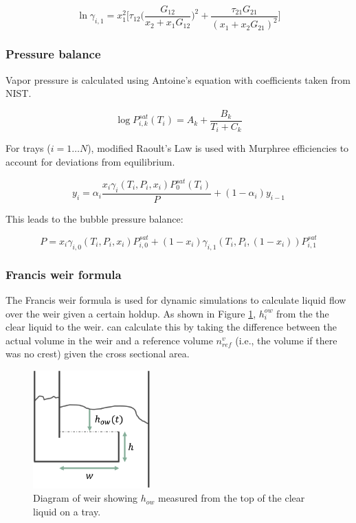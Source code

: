 \begin{equation}
     \ln \gamma_{i,1} = x_1^2\biggl [\tau_{12} \biggl (\frac{G_{12}}{x_2+x_1G_{12}}\biggr)^2 + \frac{\tau_{21}G_{21}}{(x_1 + x_2 G_{21})^2} \biggr ]   
\end{equation}

\subsubsection{Pressure balance}

Vapor pressure is calculated using Antoine’s equation with coefficients taken from NIST. 

\begin{equation}
    \log P_{i,k}^{sat}(T_i) = A_k + \frac{B_k}{T_i + C_k}
\end{equation}

For trays ($i=1\dots N$), modified Raoult’s Law is used with Murphree efficiencies to account for deviations from equilibrium.

\begin{equation}
    y_i = \alpha_i\frac{x_i\gamma_i(T_i, P_i, x_i)P_0^{sat}(T_i)}{P} + (1-\alpha_i)y_{i-1}
\end{equation}

This leads to the bubble pressure balance:

\begin{equation}
    P = x_i\gamma_{i,0}(T_i, P_i, x_i)P^{sat}_{i,0} + (1-x_i)\gamma_{i,1}(T_i, P_i, (1-x_i))P^{sat}_{i,1}
\end{equation}

\subsubsection{Francis weir formula}

The Francis weir formula is used for dynamic simulations to calculate liquid flow over the weir given a certain holdup. As shown in Figure \ref{fig:weir}, $h_i^{ow}$ from the the clear liquid to the weir. can calculate this by taking the difference between the actual volume in the weir and a reference volume $n^v_{ref}$ (i.e., the volume if there was no crest) given the cross sectional area.

\begin{figure}
    \centering
    \includegraphics[width=0.4\textwidth]{gfx/Chapter06/weir.png}
    \caption{Diagram of weir showing $h_{ow}$ measured from the top of the clear liquid on a tray.}
    \label{fig:weir}
\end{figure}


